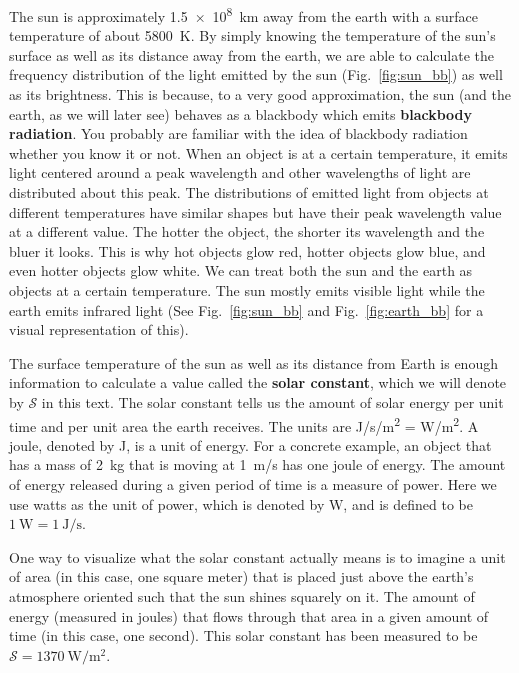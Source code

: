         The sun is approximately \SI{1.5e8}{\km} away from the earth with a surface temperature of about \SI{5800}{\kelvin}. By simply knowing the temperature of the sun's surface as well as its distance away from the earth, we are able to calculate the frequency distribution of the light emitted by the sun (Fig.~\ref{fig:sun_bb}) as well as its brightness. This is because, to a very good approximation, the sun (and the earth, as we will later see) behaves as a blackbody which emits \textbf{blackbody radiation}. You probably are familiar with the idea of blackbody radiation whether you know it or not. When an object is at a certain temperature, it emits light centered around a peak wavelength and other wavelengths of light are distributed about this peak. The distributions of emitted light from objects at different temperatures have similar shapes but have their peak wavelength value at a different value. The hotter the object, the shorter its wavelength and the bluer it looks. This is why hot objects glow red, hotter objects glow blue, and even hotter objects glow white. We can treat both the sun and the earth as objects at a certain temperature. The sun mostly emits visible light while the earth emits infrared light (See Fig.~\ref{fig:sun_bb} and Fig.~\ref{fig:earth_bb} for a visual representation of this).

        The surface temperature of the sun as well as its distance from Earth is enough information to calculate a value called the \textbf{solar constant}, which we will denote by $\mathcal{S}$ in this text. The solar constant tells us the amount of solar energy per unit time and per unit area the earth receives. The units are \si{\joule/\second/\meter^{2}} = \si{\watt/\meter^{2}}. A joule, denoted by \si{\joule}, is a unit of energy. For a concrete example, an object that has a mass of \SI{2}{\kg} that is moving at \SI{1}{\m/\s} has one joule of energy. The amount of energy released during a given period of time is a measure of power. Here we use watts as the unit of power, which is denoted by \si{\watt}, and is defined to be $\SI{1}{\watt} = \SI{1}{\joule/\s}$. 

        One way to visualize what the solar constant actually means is to imagine a unit of area (in this case, one square meter) that is placed just above the earth's atmosphere oriented such that the sun shines squarely on it. The amount of energy (measured in joules) that flows through that area in a given amount of time (in this case, one second). This solar constant has been measured to be $\mathcal{S} = \SI{1370}{\watt/\m^2}$.\cite{schroeder1999introduction,thorndike1976energy}

